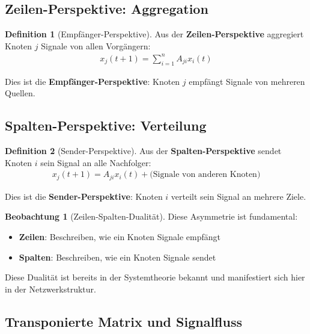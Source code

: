 ﻿\documentclass[a4paper,12pt]{report}
\theoremstyle{definition}
\newtheorem{definition}{Definition}
\newtheorem{beobachtung}{Beobachtung}
\begin{document}
	\subsection{Zeilen-Perspektive: Aggregation}
	
	\begin{definition}[Empfänger-Perspektive]
		Aus der \textbf{Zeilen-Perspektive} aggregiert Knoten $j$ Signale von allen Vorgängern:
		\begin{align}
			x_j(t+1) = \sum_{i=1}^{n} A_{ji} x_i(t)
		\end{align}
		
		Dies ist die \textbf{Empfänger-Perspektive}: Knoten $j$ empfängt Signale von mehreren Quellen.
	\end{definition}
	
	\subsection{Spalten-Perspektive: Verteilung}
	
	\begin{definition}[Sender-Perspektive]
		Aus der \textbf{Spalten-Perspektive} sendet Knoten $i$ sein Signal an alle Nachfolger:
		\begin{align}
			x_j(t+1) = A_{ji} x_i(t) + \text{(Signale von anderen Knoten)}
		\end{align}
		
		Dies ist die \textbf{Sender-Perspektive}: Knoten $i$ verteilt sein Signal an mehrere Ziele.
	\end{definition}
	
	\begin{beobachtung}[Zeilen-Spalten-Dualität]
		Diese Asymmetrie ist fundamental:
		\begin{itemize}
			\item[-] \textbf{Zeilen}: Beschreiben, wie ein Knoten Signale empfängt
			\item[-] \textbf{Spalten}: Beschreiben, wie ein Knoten Signale sendet
		\end{itemize}
		
		Diese Dualität ist bereits in der Systemtheorie bekannt und manifestiert sich hier in der Netzwerkstruktur.
	\end{beobachtung}
	
	\subsection{Transponierte Matrix und Signalfluss}
	
\end{document}
